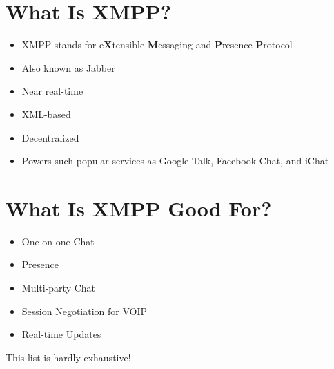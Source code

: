 \section{What Is XMPP?}
\pause

\begin{itemize}
\item XMPP stands for e\textbf{X}tensible \textbf{M}essaging and \textbf{P}resence \textbf{P}rotocol
\pause
\item Also known as Jabber
\pause
\item Near real-time
\pause
\item XML-based
\pause
\item Decentralized
\pause
\item Powers such popular services as Google Talk, Facebook Chat, and iChat
\end{itemize}

\newpage
\section{What Is XMPP Good For?}
\pause

\begin{itemize}
\item One-on-one Chat
\pause
\item Presence
\pause
\item Multi-party Chat
\pause
\item Session Negotiation for VOIP
\pause
\item Real-time Updates
\end{itemize}

\pause
\vfill
This list is hardly exhaustive!
